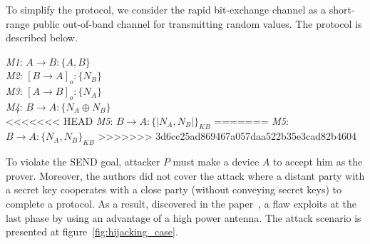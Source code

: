 To simplify the protocol, we consider the rapid bit-exchange channel as a short-range public out-of-band channel for transmitting random values. The protocol is described below. 

\begin{center}
\begin{flushleft}
 \emph{M1}: $A \rightarrow B :\{A,B\}$ \\
\emph{M2}: $[B \rightarrow A]_o :\{N_B\}$ \\
\emph{M3}: $[A \rightarrow B]_o : \{N_A\}$\\
\emph{M4}: $B \rightarrow A :\{N_A \oplus N_B\}$ \\
<<<<<<< HEAD
\emph{M5}: $B \rightarrow A : \{|N_A,N_B|\}_{KB}$
=======
\emph{M5}: $B \rightarrow A : \{N_A,N_B\}_{KB}$
>>>>>>> 3d6cc25ad869467a057daa522b35e3cad82b4604
\end{flushleft}
\end{center}

To violate the SEND goal, attacker $P$ must make a device $A$ to accept him as the prover. Moreover, the authors did not cover the attack where a distant party with a secret key cooperates with a close party (without conveying secret keys) to complete a protocol. As a result, discovered in the paper~\cite{6234408}, a flaw exploits at the last phase by using an advantage of a high power antenna. The attack scenario is presented at figure~\ref{fig:hijacking_case}. 

